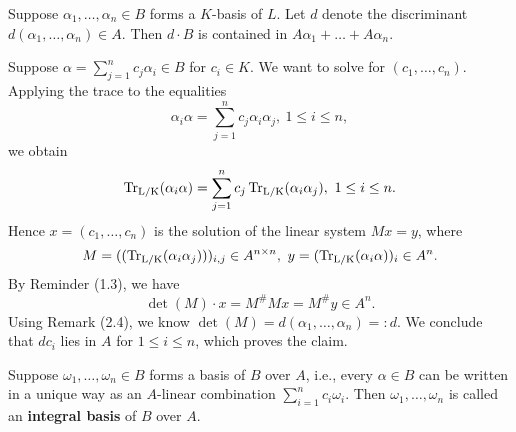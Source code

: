 \begin{Prop}
	Suppose $\alpha_1,\dots,\alpha_n\in B$ forms a $K$-basis of $L$. Let $d$ denote the discriminant $d(\alpha_1,\dots,\alpha_n)\in A$. Then $d\cdot B$ is contained in $A\alpha_1+\dots+A\alpha_n$.
\end{Prop}

\begin{Bew}
	Suppose $\alpha=\sum_{j=1}^{n} c_j\alpha_i\in B$ for $c_i\in K$. We want to solve for $(c_1,\dots,c_n)$. Applying the trace to the equalities
	$$\alpha_i\alpha=\sum_{j=1}^{n} c_j\alpha_i\alpha_j,~1\le i\le n,$$
	we obtain
	$$\operatorname{Tr_{L/K}}(\alpha_i\alpha)=\sum_{j=1}^{n} c_j \operatorname{Tr_{L/K}}(\alpha_i\alpha_j),~1\le i\le n.$$
	Hence $x=(c_1,\dots,c_n)$ is the solution of the linear system $Mx=y$, where 
	$$M=((\operatorname{Tr_{L/K}}(\alpha_i\alpha_j)))_{i,j}\in A^{n\times n}, ~ y=(\operatorname{Tr_{L/K}}(\alpha_i\alpha))_i\in A^n.$$
	By Reminder (1.3), we have 
	$$\det(M)\cdot x=M^\#Mx=M^\#y\in A^n.$$
	Using Remark (2.4), we know $\det(M)=d(\alpha_1,\dots,\alpha_n)=:d$. We conclude that $dc_i$ lies in $A$ for $1\le i\le n$, which proves the claim.
\end{Bew}

\begin{defi}[Ganzheitsbasis]
	Suppose $\omega_1,\dots,\omega_n\in B$ forms a basis of $B$ over $A$, i.e., every $\alpha\in B$ can be written in a unique way as an $A$-linear combination $\sum_{i=1}^{n}c_i\omega_i$. Then $\omega_1,\dots,\omega_n$ is called an \textbf{integral basis} of $B$ over $A$.
\end{defi}